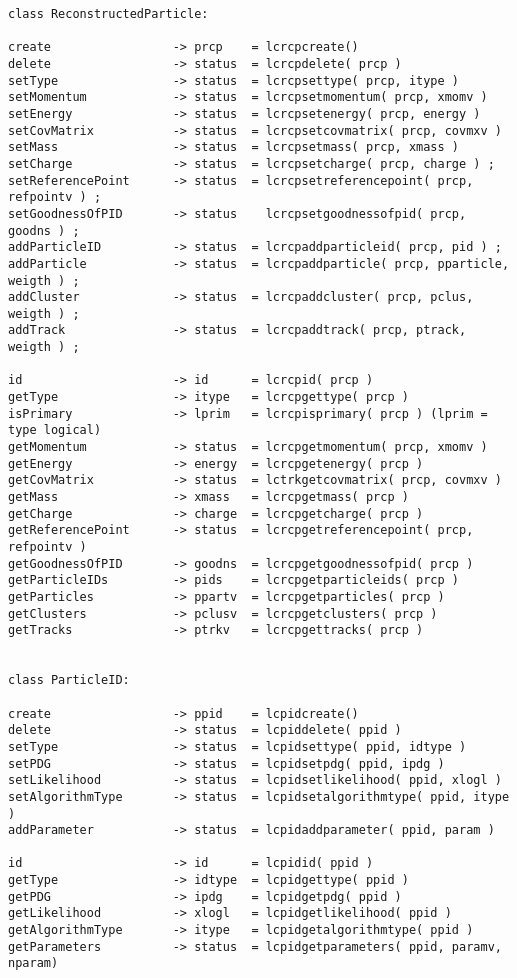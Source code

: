 \begin{scriptsize}
\begin{verbatim}
class ReconstructedParticle:

create                 -> prcp    = lcrcpcreate()
delete                 -> status  = lcrcpdelete( prcp )
setType                -> status  = lcrcpsettype( prcp, itype )
setMomentum            -> status  = lcrcpsetmomentum( prcp, xmomv )
setEnergy              -> status  = lcrcpsetenergy( prcp, energy )
setCovMatrix           -> status  = lcrcpsetcovmatrix( prcp, covmxv )
setMass                -> status  = lcrcpsetmass( prcp, xmass )
setCharge              -> status  = lcrcpsetcharge( prcp, charge ) ;
setReferencePoint      -> status  = lcrcpsetreferencepoint( prcp, refpointv ) ;
setGoodnessOfPID       -> status    lcrcpsetgoodnessofpid( prcp, goodns ) ;
addParticleID          -> status  = lcrcpaddparticleid( prcp, pid ) ;
addParticle            -> status  = lcrcpaddparticle( prcp, pparticle, weigth ) ;
addCluster             -> status  = lcrcpaddcluster( prcp, pclus, weigth ) ;
addTrack               -> status  = lcrcpaddtrack( prcp, ptrack, weigth ) ;

id                     -> id      = lcrcpid( prcp )
getType                -> itype   = lcrcpgettype( prcp )
isPrimary              -> lprim   = lcrcpisprimary( prcp ) (lprim = type logical)
getMomentum            -> status  = lcrcpgetmomentum( prcp, xmomv )
getEnergy              -> energy  = lcrcpgetenergy( prcp )
getCovMatrix           -> status  = lctrkgetcovmatrix( prcp, covmxv )
getMass                -> xmass   = lcrcpgetmass( prcp )
getCharge              -> charge  = lcrcpgetcharge( prcp )
getReferencePoint      -> status  = lcrcpgetreferencepoint( prcp, refpointv )
getGoodnessOfPID       -> goodns  = lcrcpgetgoodnessofpid( prcp )
getParticleIDs         -> pids    = lcrcpgetparticleids( prcp )
getParticles           -> ppartv  = lcrcpgetparticles( prcp )
getClusters            -> pclusv  = lcrcpgetclusters( prcp )
getTracks              -> ptrkv   = lcrcpgettracks( prcp )


class ParticleID:

create                 -> ppid    = lcpidcreate()
delete                 -> status  = lcpiddelete( ppid )
setType                -> status  = lcpidsettype( ppid, idtype )
setPDG                 -> status  = lcpidsetpdg( ppid, ipdg )
setLikelihood          -> status  = lcpidsetlikelihood( ppid, xlogl )
setAlgorithmType       -> status  = lcpidsetalgorithmtype( ppid, itype )
addParameter           -> status  = lcpidaddparameter( ppid, param )

id                     -> id      = lcpidid( ppid )
getType                -> idtype  = lcpidgettype( ppid )
getPDG                 -> ipdg    = lcpidgetpdg( ppid )
getLikelihood          -> xlogl   = lcpidgetlikelihood( ppid )
getAlgorithmType       -> itype   = lcpidgetalgorithmtype( ppid )
getParameters          -> status  = lcpidgetparameters( ppid, paramv, nparam)



\end{verbatim}
\end{scriptsize}
